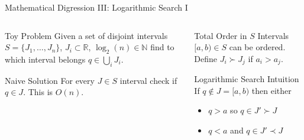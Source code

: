\documentclass[xetex]{beamer}
\begin{document}
\begin{frame}[fragile]{Mathematical Digression III: Logarithmic Search I}
  \begin{center}
  \end{center}
  \begin{columns}[t]
    \begin{column}{.45\linewidth}
      \begin{block}{Toy Problem}
        Given a set of disjoint intervals $S = \{J_1, \ldots, J_n\}$, $J_i
        \subset \mathbb{R}$, $\log_2(n) \in \mathbb{N}$ find to which interval
        belongs $q \in \bigcup_i J_i$.
      \end{block}
      \begin{block}{Naive Solution}
        For every $J \in S$ interval check if $q \in J$. This is $O(n)$.
      \end{block}
    \end{column}
    \begin{column}{.55\linewidth}
      \pause
      \begin{alertblock}{Total Order in $S$}
        Intervals $[a, b) \in S$ can be ordered. Define 
        $J_i \succ J_j$ if $a_i > a_j$.
      \end{alertblock}
      \begin{block}{Logarithmic Search Intuition}
        If $q \notin J = [a,b)$ then either
        \begin{itemize}
          \item $q > a$ so $q \in J' \succ J$
          \item $q < a$ and $q \in J' \prec J$
        \end{itemize}
      \end{block}
    \end{column}
  \end{columns}
\end{frame}
\end{document}
